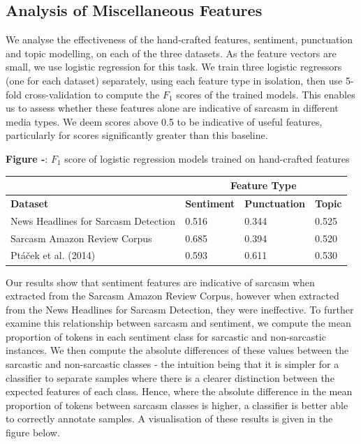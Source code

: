 \documentclass[12pt,a4paper]{article}
\begin{document}
\subsection{Analysis of Miscellaneous Features}
\noindent We analyse the effectiveness of the hand-crafted features, sentiment, punctuation and topic modelling, on each of the three datasets. As the feature vectors are small, we use logistic regression for this task. We train three logistic regressors (one for each dataset) separately, using each feature type in isolation, then use 5-fold cross-validation to compute the $F_1$ scores of the trained models. This enables us to assess whether these features alone are indicative of sarcasm in different media types. We deem scores above 0.5 to be indicative of useful features, particularly for scores significantly greater than this baseline.


\begin{center}
	\textbf{Figure -}: $F_1$ score of logistic regression models trained on hand-crafted features
\end{center}

\begin{center}
	\begin{tabular}{|p{7cm}|p{1.8cm}|p{2.6cm}|p{1.6cm}|} 
		\hline
		& \multicolumn{3}{|c|}{\textbf{Feature Type}} \\
		\hline
		\textbf{Dataset} & \textbf{Sentiment} & \textbf{Punctuation} & \textbf{Topic} \\ [0.4ex] 
		\hline\hline
		News Headlines for Sarcasm Detection & 0.516 & 0.344 & 0.525\\ 
		\hline
		Sarcasm Amazon Review Corpus & 0.685 & 0.394 & 0.520\\ 
		\hline
		Pt\'a\v{c}ek et al. (2014) & 0.593 & 0.611 & 0.530\\
		\hline
	\end{tabular}
\end{center}

\noindent Our results show that sentiment features are indicative of sarcasm when extracted from the Sarcasm Amazon Review Corpus, however when extracted from the News Headlines for Sarcasm Detection, they were ineffective. To further examine this relationship between sarcasm and sentiment, we compute the mean proportion of tokens in each sentiment class for sarcastic and non-sarcastic instances. We then compute the absolute differences of these values between the sarcastic and non-sarcastic classes - the intuition being that it is simpler for a classifier to separate samples where there is a clearer distinction between the expected features of each class. Hence, where the absolute difference in the mean proportion of tokens between sarcasm classes is higher, a classifier is better able to correctly annotate samples. A visualisation of these results is given in the figure below.
\end{document}
